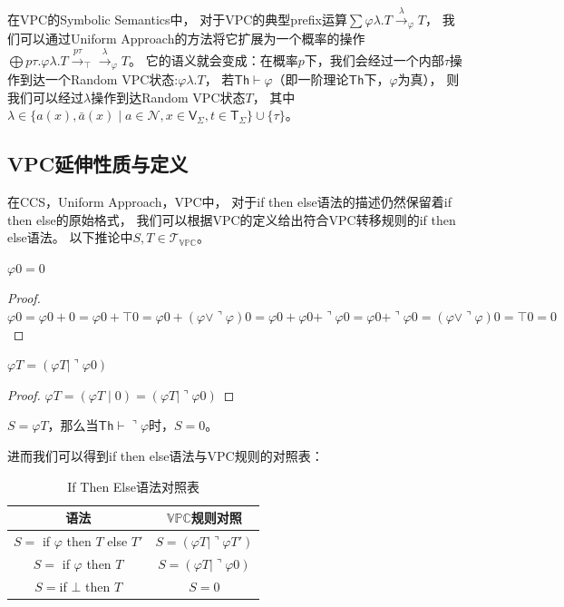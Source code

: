 在VPC的Symbolic Semantics中，
对于VPC的典型prefix运算$\sum \varphi \lambda. T\stackrel{\lambda}{\rightarrow}_{\varphi} T$，
我们可以通过Uniform Approach的方法将它扩展为一个概率的操作
$\bigoplus p\tau.\varphi \lambda. T\stackrel{p\tau}{\rightarrow}_{\top}\stackrel{\lambda}{\rightarrow}_{\varphi} T$。
它的语义就会变成：在概率$p$下，我们会经过一个内部$\tau$操作到达一个Random VPC状态:$\varphi\lambda.T$，
若$\mathsf{Th}\vdash \varphi$（即一阶理论$\mathsf{Th}$下，$\varphi$为真），
则我们可以经过$\lambda$操作到达Random VPC状态$T$， 其中$\lambda \in \{a(x),\bar{a}(x)\mid a\in \mathcal{N}, x\in \mathsf{V}_\Sigma, t\in \mathsf{T}_\Sigma\}\cup \{\tau\}$。

\subsection{VPC延伸性质与定义}

在CCS，Uniform Approach，VPC中，
对于if then else语法的描述仍然保留着if then else的原始格式，
我们可以根据VPC的定义给出符合VPC转移规则的if then else语法。
以下推论中$S,T\in \mathcal{T}_{\mathbb{VPC}}$。
\begin{corollary} 
   $\varphi 0 = 0$
\end{corollary}
\begin{proof}
   $\varphi 0 = \varphi 0 + 0 = \varphi 0 + \top 0 = \varphi 0 + (\varphi \vee \urcorner \varphi)0 = \varphi 0 + \varphi 0 + \urcorner \varphi 0 = \varphi 0 + \urcorner \varphi 0 = (\varphi \vee \urcorner \varphi)0 = \top 0 = 0$
\end{proof}
\begin{corollary}
   $\varphi T = (\varphi T\mid \urcorner \varphi 0)$
\end{corollary}
\begin{proof}
   $\varphi T = (\varphi T\mid 0) = (\varphi T\mid \urcorner \varphi 0)$
\end{proof}
\begin{corollary}
   $S=\varphi T$，那么当$\mathsf{Th}\vdash \urcorner \varphi$时，$S=0$。
\end{corollary}
进而我们可以得到if then else语法与VPC规则的对照表：
\begin{table}[!hpt]
   \caption[If Then Else语法对照表]{If Then Else语法对照表\footnotemark}
   \label{tab:ifthenelse}
   \centering
   \begin{tabular}{@{}cc@{}} \toprule
     语法 & $\mathbb{VPC}$规则对照 \\ \midrule
     $S=$ if $\varphi$ then $T$ else $T'$& $S=(\varphi T|\urcorner \varphi T')$\\
     $S=$ if $\varphi$ then $T$ & $S=(\varphi T|\urcorner\varphi 0)$\\
     $S = $if $\bot$ then $T$ & $S=0$\\ \bottomrule
   \end{tabular}
 \end{table}

